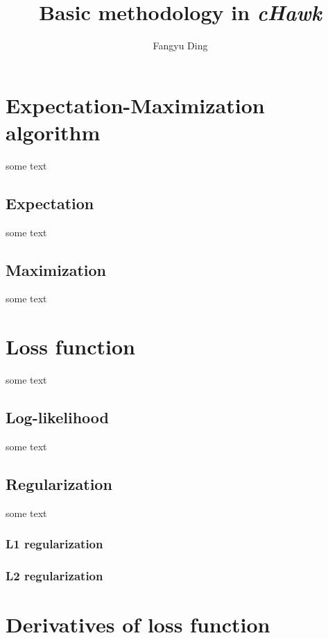 \documentclass{article}
\title{Basic methodology in \textit{cHawk}}
\author{Fangyu Ding}
\begin{document}
	\maketitle
	
	\tableofcontents
	
	\newpage
	
	\section{Expectation-Maximization algorithm}
	
	some text
	
		\subsection{Expectation}
		
		some text
		
		\subsection{Maximization}
		
		some text
	
	\section{Loss function}
	
	some text
	
		\subsection{Log-likelihood}
		
		some text
		
		\subsection{Regularization}
		
		some text
			\subsubsection{L1 regularization}
			\subsubsection{L2 regularization}
	
	
	\section{Derivatives of loss function}
	
\end{document}
